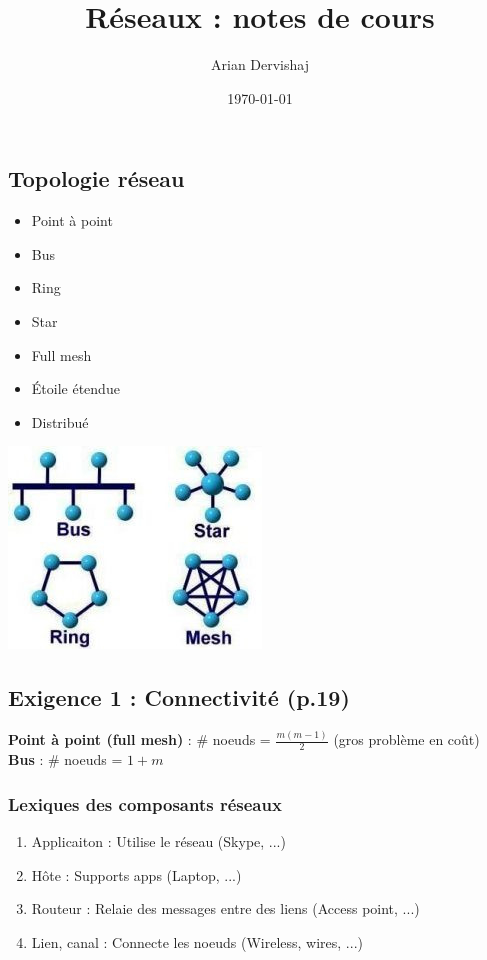 \documentclass[12pt]{article}
\title{Réseaux : notes de cours}
\author{Arian Dervishaj}
\date{\today}
\begin{document}
\maketitle
\pagebreak

\subsection*{Topologie réseau}
\begin{minipage}{0.3\textwidth}
    \begin{itemize}
        \item Point à point
        \item Bus
        \item Ring
        \item Star
        \item Full mesh
        \item Étoile étendue
        \item Distribué
    \end{itemize}
\end{minipage}
\begin{minipage}{0.6\textwidth}
    \includegraphics{topologie.jpeg}
\end{minipage}

\subsection*{Exigence 1 : Connectivité (p.19)}


\textbf{Point à point (full mesh) }: \# noeuds = $\frac{m(m-1)}{2}$ (gros problème en coût)\\
\textbf{Bus} : \# noeuds = $1+m$

\subsubsection*{Lexiques des composants réseaux}
\begin{enumerate}
    \item Applicaiton : Utilise le réseau (Skype, ...)
    \item Hôte : Supports apps (Laptop, ...)
    \item Routeur : Relaie des messages entre des liens (Access point, ...)
    \item Lien, canal : Connecte les noeuds (Wireless, wires, ...)
\end{enumerate}
\end{document}
